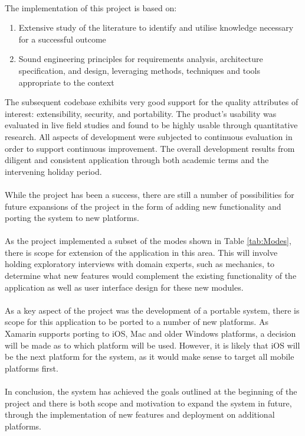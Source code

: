 	\paragraph{}{
	The implementation of this project is based on:
	\begin{enumerate}
		\item Extensive study of the literature to identify and utilise knowledge necessary for a successful outcome
		\item Sound engineering principles for requirements analysis, architecture specification, and design, leveraging methods, techniques and tools appropriate to the context
	\end{enumerate}
	
	The subsequent codebase exhibits very good support for the quality attributes of interest: extensibility, security, and portability. The product's usability was evaluated in live field studies and found to be highly usable through quantitative research. All aspects of development were subjected to continuous evaluation in order to support continuous improvement. The overall development results from diligent and consistent application through both academic terms and the intervening holiday period.
	}

	\paragraph{}{
	While the project has been a success, there are still a number of possibilities for future expansions of the project in the form of adding new functionality and porting the system to new platforms.
	}
			
	\paragraph{}{
	As the project implemented a subset of the modes shown in Table \ref{tab:Modes}, there is scope for extension of the application in this area. This will involve holding exploratory interviews with domain experts, such as mechanics, to determine what new features would complement the existing functionality of the application as well as user interface design for these new modules.
	}
	
	\paragraph{}{
	As a key aspect of the project was the development of a portable system, there is scope for this application to be ported to a number of new platforms. As Xamarin supports porting to iOS, Mac and older Windows platforms, a decision will be made as to which platform will be used. However, it is likely that iOS will be the next platform for the system, as it would make sense to target all mobile platforms first.
	}
	\paragraph{}{
	In conclusion, the system has achieved the goals outlined at the beginning of the project and there is both scope and motivation to expand the system in future, through the implementation of new features and deployment on additional platforms.
	}